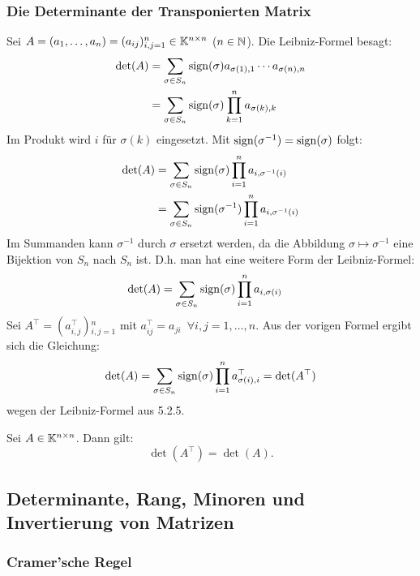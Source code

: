 \subsubsection{Die Determinante der Transponierten Matrix}

Sei $ A = (a_1, \ldots, a_n) = (a_{ij}){}_{i,j=1}^n \in \mathbb K^{n \times n} $ ($ n \in \mathbb N $). Die Leibniz-Formel besagt:
\begin{align*}
	\det(A) &= \sum_{\sigma \in S_n} \operatorname{sign}(\sigma) a_{\sigma(1),1} \cdots a_{\sigma(n),n} \\
	&= \sum_{\sigma \in S_n} \operatorname{sign}(\sigma) \prod_{k=1}^{n} a_{\sigma(k),k}
\end{align*}
Im Produkt wird $ i $ für $ \sigma(k) $ eingesetzt. Mit $ \operatorname{sign}(\sigma^{-1})=\operatorname{sign}(\sigma) $ folgt:
\begin{align*}
	\det(A) &= \sum_{\sigma \in S_n} \operatorname{sign}(\sigma) \prod_{i=1}^{n} a_{i,\sigma^{-1}(i)} \\
	&= \sum_{\sigma \in S_n} \operatorname{sign}(\sigma^{-1}) \prod_{i=1}^{n} a_{i,\sigma^{-1}(i)}
\end{align*}
Im Summanden kann $ \sigma^{-1} $ durch $ \sigma $ ersetzt werden, da die Abbildung $ \sigma \mapsto \sigma^{-1} $ eine Bijektion von $ S_n $ nach $ S_n $ ist. D.h. man hat eine weitere Form der Leibniz-Formel:
\begin{align*}
	\det(A) &= \sum_{\sigma \in S_n} \operatorname{sign}(\sigma) \prod_{i=1}^{n} a_{i,\sigma(i)}
\end{align*}
Sei $ A^\top = (a^\top_{i,j}){}_{i,j=1}^n $ mit $ a_{ij}^\top = a_{ji} \enspace\forall i,j = 1,\ldots,n $. Aus der vorigen Formel ergibt sich die Gleichung:
\begin{equation*}
	\det(A) = \sum_{\sigma \in S_n} \operatorname{sign}(\sigma) \prod_{i=1}^{n} a_{\sigma(i),i}^\top = \det(A^\top)
\end{equation*}
wegen der Leibniz-Formel aus 5.2.5.

\begin{thm}
	Sei $ A \in \mathbb K^{n \times n} $. Dann gilt:
	\begin{equation}
		\det(A^\top) = \det(A).
	\end{equation}
\end{thm}

\clearpage
\subsection{Determinante, Rang, Minoren und Invertierung von Matrizen}

\subsubsection{Cramer'sche Regel}


